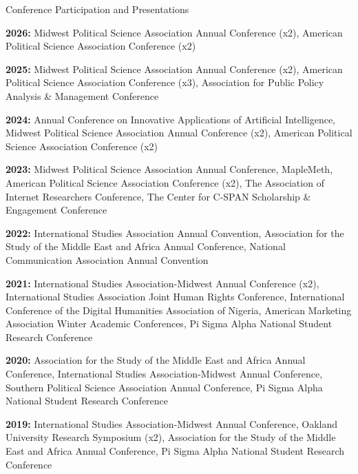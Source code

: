 \documentclass{resume} %
\begin{document}

\begin{rSection}{Conference Participation and Presentations}

\textbf{2026:} Midwest Political Science Association Annual Conference (x2), American Political Science Association Conference (x2)

\textbf{2025:} Midwest Political Science Association Annual Conference (x2), American Political Science Association Conference (x3), Association for Public Policy Analysis \& Management Conference

\textbf{2024:} Annual Conference on Innovative Applications of Artificial Intelligence, Midwest Political Science Association Annual Conference (x2), American Political Science Association Conference (x2) \vspace{2mm}

\textbf{2023:} Midwest Political Science Association Annual Conference, MapleMeth, American Political Science Association Conference (x2), The Association of Internet Researchers Conference, The Center for C-SPAN Scholarship \& Engagement Conference \vspace{2mm}

\textbf{2022:} International Studies Association Annual Convention, Association for the Study of the Middle East and Africa Annual Conference, National Communication Association Annual Convention \vspace{2mm}

\textbf{2021:} International Studies Association-Midwest Annual Conference (x2), International Studies Association Joint Human Rights Conference, International Conference of the Digital Humanities Association of Nigeria, American Marketing Association Winter Academic Conferences, Pi Sigma Alpha National Student Research Conference \vspace{2mm}

\textbf{2020:} Association for the Study of the Middle East and Africa Annual Conference, International Studies Association-Midwest Annual Conference, Southern Political Science Association Annual Conference, Pi Sigma Alpha National Student Research Conference

\textbf{2019:} International Studies Association-Midwest Annual Conference, Oakland University Research Symposium (x2), Association for the Study of the Middle East and Africa Annual Conference, Pi Sigma Alpha National Student Research Conference

\end{rSection}
\end{document}
